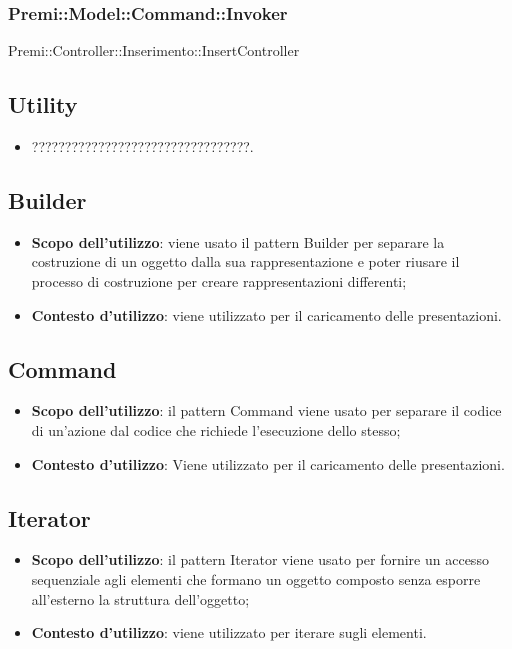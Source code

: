 {{\begin{itemize}
			\subsubsection{Premi::Model::Command::Invoker}{
				Premi::Controller::Inserimento::InsertController
			}
		\end{itemize}
	}
	\subsection{Utility}{
		\begin{itemize}
			\item ?????????????????????????????????.
		\end{itemize}
	}
	\subsection{Builder}{
		\begin{itemize}
			\item \textbf{Scopo dell’utilizzo}: viene usato il pattern Builder per separare la costruzione di un oggetto dalla sua rappresentazione e poter riusare il processo di costruzione per creare rappresentazioni differenti;
			\item \textbf{Contesto d’utilizzo}: viene utilizzato per il caricamento delle presentazioni.
		\end{itemize}
	}
	\subsection{Command}{
		\begin{itemize}
			\item \textbf{Scopo dell’utilizzo}: il pattern Command viene usato per separare il codice di un’azione dal codice che richiede l’esecuzione dello stesso;
			\item \textbf{Contesto d’utilizzo}: Viene utilizzato per il caricamento delle presentazioni.
		\end{itemize}
	}
	\subsection{Iterator}{
		\begin{itemize}
			\item \textbf{Scopo dell’utilizzo}: il pattern Iterator viene usato per fornire un accesso sequenziale agli elementi che formano un oggetto composto senza esporre all’esterno la struttura dell’oggetto;
			\item \textbf{Contesto d’utilizzo}: viene utilizzato per iterare sugli elementi.
		\end{itemize}
	}
}
